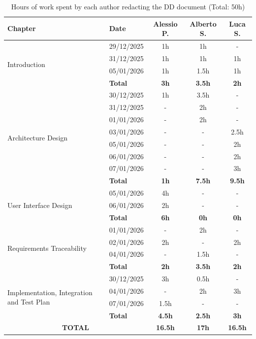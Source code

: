 \begin{table}[H]
\centering
\begin{tabular}{|p{4.5cm}|l|c|c|c|}
\hline
\textbf{Chapter} & \textbf{Date} & \textbf{Alessio P.} & \textbf{Alberto S.} & \textbf{Luca S.} \\ 
\hline

\multirow{4}{=}{Introduction} 
& 29/12/2025 & 1h & 1h & - \\  
& 31/12/2025 & 1h & 1h & 1h \\
& 05/01/2026 & 1h & 1.5h & 1h \\
\cline{2-5}
& \textbf{Total} & \textbf{3h} & \textbf{3.5h} & \textbf{2h} \\ 
\hline

\multirow{8}{=}{Architecture Design} 
& 30/12/2025 & 1h & 3.5h & - \\ 
& 31/12/2025 & - & 2h & - \\ 
& 01/01/2026 & - & 2h & - \\ 
& 03/01/2026 & - & - & 2.5h \\
& 05/01/2026 & - & - & 2h \\
& 06/01/2026 & - & - & 2h \\
& 07/01/2026 & - & - & 3h \\ 
\cline{2-5}
& \textbf{Total} & \textbf{1h} & \textbf{7.5h} & \textbf{9.5h} \\ 
\hline

\multirow{3}{=}{User Interface Design} 
& 05/01/2026 & 4h & - & - \\  
& 06/01/2026 & 2h & - & - \\
\cline{2-5}
& \textbf{Total} & \textbf{6h} & \textbf{0h} & \textbf{0h} \\ 
\hline

\multirow{4}{=}{Requirements Traceability} 
& 01/01/2026 & - & 2h & - \\ 
& 02/01/2026 & 2h & - & 2h \\ 
& 04/01/2026 & - & 1.5h & - \\ 
\cline{2-5}
& \textbf{Total} & \textbf{2h} & \textbf{3.5h} & \textbf{2h} \\ 
\hline

\multirow{4}{=}{Implementation, Integration and Test Plan} 
& 30/12/2025 & 3h & 0.5h & - \\  
& 04/01/2026 & - & 2h & 3h \\ 
& 07/01/2026 & 1.5h & - & - \\ 
\cline{2-5}
& \textbf{Total} & \textbf{4.5h} & \textbf{2.5h} & \textbf{3h} \\ 
\hline

\multicolumn{2}{|c|}{\textbf{TOTAL}} & \textbf{16.5h} & \textbf{17h} & \textbf{16.5h} \\
\hline

\end{tabular}
\caption{Hours of work spent by each author redacting the DD document (Total: 50h)}
\label{tab:effort}
\end{table}